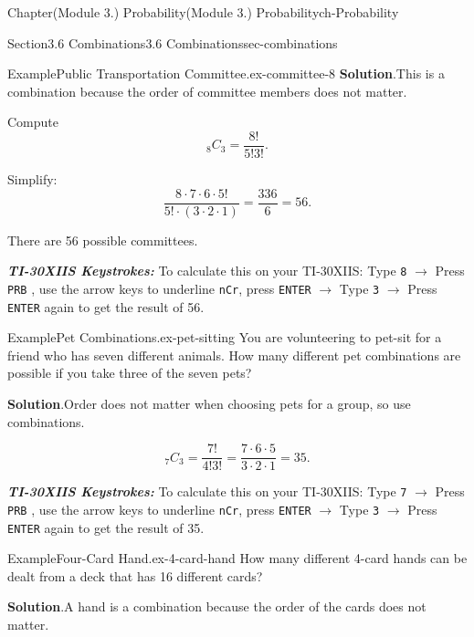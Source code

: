 \documentclass[oneside,10pt,]{book}
\newcommand{\blocktitlefont}{\relax}
\newcommand{\mono}[1]{\texttt{#1}}
\newcommand{\alert}[1]{\textbf{\textit{#1}}}
\begin{document}
\begin{chapterptx}{Chapter}{(Module 3.) Probability}{}{(Module 3.) Probability}{}{}{ch-Probability}
\begin{sectionptx}{Section}{3.6 Combinations}{}{3.6 Combinations}{}{}{sec-combinations}
\begin{example}{Example}{Public Transportation Committee.}{ex-committee-8}
\noindent\textbf{\blocktitlefont Solution}.\hypertarget{ex-committee-8-3}{}\quad{}This is a combination because the order of committee members does not matter.%
\par
Compute%
\begin{equation*}
{}_8 C_3 = \frac{8!}{5!3!}\text{.}
\end{equation*}
%
\par
Simplify:%
\begin{equation*}
\frac{8 \cdot 7 \cdot 6 \cdot 5!}{5! \cdot (3 \cdot 2 \cdot 1)} = \frac{336}{6} = 56.
\end{equation*}
%
\par
There are 56 possible committees.%
\par
\alert{TI-30XIIS Keystrokes:} To calculate this on your TI-30XIIS: Type \mono{8} \(\rightarrow\) Press \mono{PRB} , use the arrow keys to underline \mono{nCr}, press \mono{ENTER} \(\rightarrow\) Type \mono{3} \(\rightarrow\) Press \mono{ENTER} again to get the result of 56.%
\end{example}
\begin{example}{Example}{Pet Combinations.}{ex-pet-sitting}%
You are volunteering to pet-sit for a friend who has seven different animals. How many different pet combinations are possible if you take three of the seven pets?%
\par\smallskip%
\noindent\textbf{\blocktitlefont Solution}.\hypertarget{ex-pet-sitting-3}{}\quad{}Order does not matter when choosing pets for a group, so use combinations.%
\par
%
\begin{equation*}
{}_7 C_3 = \frac{7!}{4!3!} = \frac{7 \cdot 6 \cdot 5}{3 \cdot 2 \cdot 1} = 35.
\end{equation*}
%
\par
\alert{TI-30XIIS Keystrokes:} To calculate this on your TI-30XIIS: Type \mono{7} \(\rightarrow\) Press \mono{PRB} , use the arrow keys to underline \mono{nCr}, press \mono{ENTER} \(\rightarrow\) Type \mono{3} \(\rightarrow\) Press \mono{ENTER} again to get the result of 35.%
\end{example}
\begin{example}{Example}{Four-Card Hand.}{ex-4-card-hand}%
How many different 4-card hands can be dealt from a deck that has 16 different cards?%
\par\smallskip%
\noindent\textbf{\blocktitlefont Solution}.\hypertarget{ex-4-card-hand-3}{}\quad{}A hand is a combination because the order of the cards does not matter.%
\par

\end{example}
\end{sectionptx}
\end{chapterptx}
\end{document}
